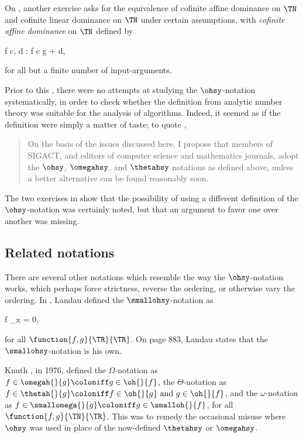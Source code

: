 \documentclass[b5paper, english, oneside]{memoir}
\begin{document}
On \cite[page 39]{DesignAndAnalysisOfComputerAlgorithms}, another exercise asks for the equivalence of cofinite affine dominance on $\TN$ and cofinite linear dominance on $\TN$ under certain assumptions, with \emph{cofinite affine dominance} on $\TN$ defined by
\begin{eqs}
f \in {} \coloniff \exists c, d \in \posi{\TR}: f \leq c g + d,
\end{eqs}
for all but a finite number of input-arguments. 

Prior to this \manuscript{}, there were no attempts at studying the $\ohsy$-notation systematically, in order to check whether the definition from analytic number theory was suitable for the analysis of algorithms. Indeed, it seemed as if the definition were simply a matter of taste; to quote \cite{BigOmega},

\begin{quotation}
On the basis of the issues discussed here, I propose that members of SIGACT, and editors of
computer science and mathematics journals, adopt the $\ohsy$, $\omegahsy$, and $\thetahsy$ notations as defined above, unless a better alternative can be found reasonably soon. 
\end{quotation}

The two exercises in \cite{DesignAndAnalysisOfComputerAlgorithms} show that the possibility of using a different definition of the $\ohsy$-notation was certainly noted, but that an argument to favor one over another was missing. 

\subsection{Related notations}

There are several other notations which resemble the way the $\ohsy$-notation works, which perhaps force strictness, reverse the ordering, or otherwise vary the ordering. In \cite[page 61]{SmallOh}, Landau defined the $\smallohsy$-notation as
\begin{eqs}
f \in {} \coloniff \lim_{x \to \infty}  = 0,
\end{eqs}
for all $\function{f, g}{\TR}{\TR}$. On page 883, Landau states that the $\smallohsy$-notation is his own.

Knuth \cite{BigOmega}, in 1976, defined the $\Omega$-notation as
$f \in \omegah{}{g} \coloniff g \in \oh{}{f}$,
the $\Theta$-notation as 
$f \in \thetah{}{g} \coloniff f \in \oh{}{g} \textrm{ and } g \in \oh{}{f}$,
and the $\omega$-notation as
$f \in \smallomega{}{g} \coloniff g \in \smalloh{}{f}$,
for all $\function{f, g}{\TN}{\TR}$. This was to remedy the occasional misuse where $\ohsy$ was used in place of the now-defined $\thetahsy$ or $\omegahsy$.
\end{document}
